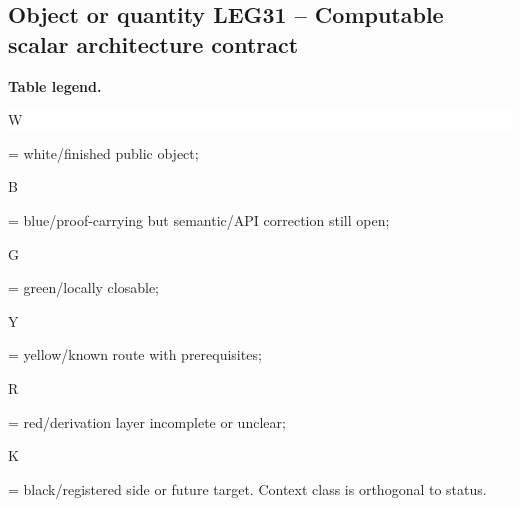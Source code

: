 \subsection*{Object or quantity LEG31 -- Computable scalar architecture contract}
\hypertarget{objproof:LEG31}{}
\par\smallskip\noindent\begin{minipage}{0.99\linewidth}\footnotesize\raggedright\textbf{Table legend.} \colorbox{white}{\strut W} = white/finished public object; \colorbox{cyan!20}{\strut B} = blue/proof-carrying but semantic/API correction still open; \colorbox{green!18}{\strut G} = green/locally closable; \colorbox{yellow!25}{\strut Y} = yellow/known route with prerequisites; \colorbox{red!20}{\strut R} = red/derivation layer incomplete or unclear; \colorbox{black!18}{\strut K} = black/registered side or future target. Context class is orthogonal to status.\end{minipage}\par\vspace{0.25em}
